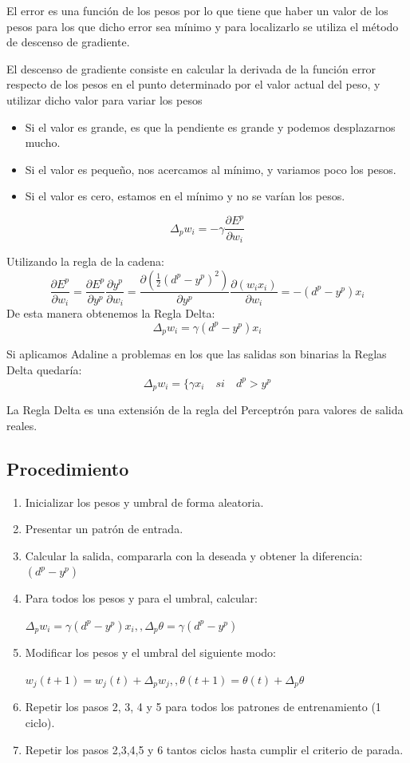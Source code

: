 \documentclass[12pt, twoside, openright]{report} %
\begin{document}
El error es una función de los pesos por lo que tiene que haber un valor de los pesos para los que dicho error sea mínimo y para localizarlo se utiliza el método de descenso de gradiente.

El descenso de gradiente consiste en calcular la derivada de la función error respecto de los pesos en el punto determinado por el valor actual del peso, y utilizar dicho valor para variar los pesos
\begin{itemize}
	\item Si el valor es grande, es que la pendiente es grande y podemos desplazarnos mucho.
	\item Si el valor es pequeño, nos acercamos al mínimo, y variamos poco los pesos.
	\item Si el valor es cero, estamos en el mínimo y no se varían los pesos.
\end{itemize}

$$\Delta_pw_i=-\gamma\frac{\partial E^p}{\partial w_i}$$

Utilizando la regla de la cadena:
$$\frac{\partial E^p}{\partial w_i}=\frac{\partial E^p}{\partial y^p}\frac{\partial y^p}{\partial w_i}=\frac{\partial (\frac 1 2 (d^p-y^p)^2)}{\partial y^p}\frac{\partial(w_ix_i)}{\partial w_i}=-(d^p-y^p)x_i$$
De esta manera obtenemos la Regla Delta:
$$\Delta_pw_i=\gamma(d^p-y^p)x_i$$

Si aplicamos Adaline a problemas en los que las salidas son binarias la Reglas Delta quedaría:
$$\Delta_pw_i=\{ \gamma x_i \quad si \quad d^p > y^p$$

La Regla Delta es una extensión de la regla del Perceptrón para valores de salida reales.

\subsection{Procedimiento}
\begin{enumerate}
	\item Inicializar los pesos y umbral de forma aleatoria.
	\item Presentar un patrón de entrada.
	\item Calcular la salida, compararla con la deseada y obtener la diferencia: $(d^p-y^p)$
	\item Para todos los pesos y para el umbral, calcular:
	      
	      $\Delta_pw_i=\gamma(d^p-y^p)x_i,, \Delta_p\theta=\gamma(d^p-y^p)$
	\item Modificar los pesos y el umbral del siguiente modo:
	      
	      $w_j(t+1)=w_j(t)+\Delta_pw_j,, \theta(t+1)=\theta(t)+\Delta_p\theta$
	\item Repetir los pasos 2, 3, 4 y 5 para todos los patrones de entrenamiento (1 ciclo).
	\item Repetir los pasos 2,3,4,5 y 6 tantos ciclos hasta cumplir el criterio de parada.
\end{enumerate}
\end{document}

